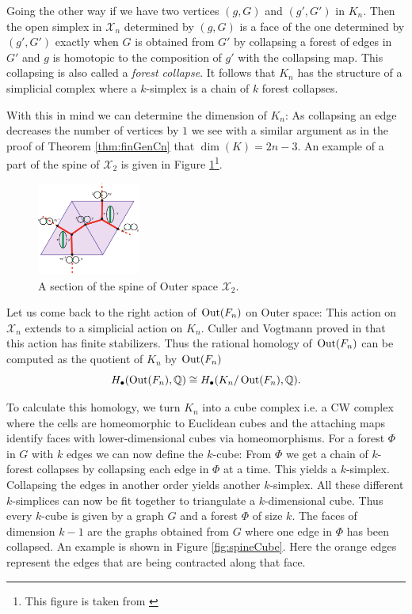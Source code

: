 Going the other way if we have two vertices $(g,G)$ and $(g',G')$ in $K_{n}$. Then the open simplex in $\mathcal{X}_{n}$ 
determined by $(g,G)$ is a face of  the one determined by $(g',G')$ exactly when $G$ is obtained from $G'$ 
by collapsing a forest of edges in $G'$ and  $g$ is homotopic to the composition of $g'$ with the collapsing map.
This collapsing is also called a \emph{forest collapse}.
It follows that $K_{n}$ has the structure of a simplicial complex where a $k$-simplex is a chain of $k$ forest collapses. 

With this in mind we can determine the dimension of $K_{n}$: As collapsing an edge decreases the number of vertices by $1$
we see with a similar argument as in the proof of Theorem \ref{thm:finGenCn} that $\dim(K) = 2n -3$.
An example of a part of the spine of $\mathcal{X}_{2}$ is given in Figure \ref{fig:SpineOfXn}\footnote{This figure is taken from \cite{vogtmann02}}. 

\begin{figure}[h]
	\centering
	\includegraphics[width=0.3\textwidth]{./Images/spineOfOuterSpace.pdf}
	\caption{A section of the spine of Outer space $\mathcal{X}_{2}$.}
	\label{fig:SpineOfXn}
\end{figure}

Let us come back to the right action of $\operatorname{Out}(F_{n})$ on Outer space: This action on $\mathcal{X}_{n}$ extends to a simplicial action on $K_{n}$.
Culler and Vogtmann proved in \cite{vogtmann86} that this action has finite stabilizers.
Thus the rational homology of $\operatorname{Out}(F_{n})$ can be computed as the quotient of $K_{n}$ by $\operatorname{Out}(F_{n})$
\[
	H_{\bullet}(\operatorname{Out}(F_{n}),\mathbb{Q}) \cong H_{\bullet}(K_{n}/ \operatorname{Out}(F_{n}),\mathbb{Q})
.\] 

To calculate this homology, we turn $K_{n}$ into a cube complex i.e. a CW complex where the cells are homeomorphic
to Euclidean cubes and the attaching maps identify faces with lower-dimensional cubes via homeomorphisms.
For a forest $\Phi$ in $G$ with $k$ edges we can now define the $k$-cube:
From $\Phi$ we get a chain of $k$-forest collapses by collapsing each edge in $\Phi$ at a time.
This yields a $k$-simplex. Collapsing the edges in another order yields another $k$-simplex.
All these different $k$-simplices can now be fit together to triangulate a $k$-dimensional cube.
Thus every $k$-cube is given by a graph $G$ and a forest $\Phi$ of size $k$.
The faces of dimension $k-1$ are the graphs obtained from $G$ where one edge in $\Phi$ has been collapsed.
An example is shown in Figure \ref{fig:spineCube}. Here the orange edges represent the edges that are being contracted along that face.

